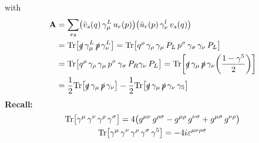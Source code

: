 \documentclass[TheoreticalPhy_ModB.tex]{subfiles}
\begin{document}
with
\[
\begin{split}
\textbf{A}	& = \sum_{r s} \bigl( \bar{v}_s(q) \, \gamma^L_{\mu} \, u_r(p) \bigr) \bigl(	\bar{u}_r(p) \, \gamma^l_{\nu} \, v_s(q) \bigr) \\
		& = \textup{Tr} \bigl[ \slashed q \, \gamma_{\mu}^L \, \slashed p \, \gamma_{\nu}^L \bigr]
			= \textup{Tr} \bigl[ q^{\rho} \, \gamma_{\rho} \, \gamma_{\mu} \, P_L \, p^{\sigma} \, \gamma_{\sigma} \, \gamma_{\nu} \, P_L \bigr] \\
		& = \textup{Tr} \bigl[ q^{\rho} \, \gamma_{\rho} \, \gamma_{\mu} \, p^{\sigma} \, \gamma_{\sigma} \, P_R \gamma_{\nu} \, P_L \bigr]
			= \textup{Tr} \biggl[ \slashed q \, \gamma_{\mu} \, \slashed p \, \gamma_{\nu} \biggl( \frac{1-\gamma^5}{2} \biggr) \biggr] \\
		& = \frac{1}{2} \textup{Tr} \bigl[ \slashed q \, \gamma_{\mu} \, \slashed p \, \gamma_{\nu} \bigr]
			- \frac{1}{2} \textup{Tr} \bigl[ \slashed q \, \gamma_{\mu} \, \slashed p \, \gamma_{\nu} \, \gamma_5 \bigr]
\end{split}
\]
\textbf{Recall:}
\begin{gather*}
\textup{Tr} \bigl[ \gamma^{\mu} \, \gamma^{\nu} \, \gamma^{\rho} \, \gamma^{\sigma} \bigr] 
	= 4 \bigl( g^{\mu\nu} \, g^{\rho\sigma} - g^{\mu\rho} \, g^{\nu\sigma} + g^{\mu\sigma} \, g^{\nu\rho} \bigr) \\
\textup{Tr} \bigl[ \gamma^{\mu} \, \gamma^{\nu} \, \gamma^{\rho} \, \gamma^{\sigma} \, \gamma^5 \bigr] = -4i\varepsilon^{\mu\nu\rho\sigma} 
\end{gather*}
\end{document}
